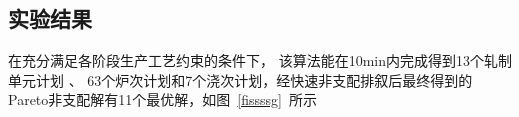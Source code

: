 \documentclass{whutmod}
\begin{document}
        \subsection{实验结果}
	在充分满足各阶段生产工艺约束的条件下， 该算法能在10min内完成得到13个轧制单元计划 、 63个炉次计划和7个浇次计划，经快速非支配排叙后最终得到的Pareto非支配解有11个最优解，如图~\ref{fissssg}~所示
  	\begin{figure}[H]
  	\centering
  \end{figure}	
\end{document}
